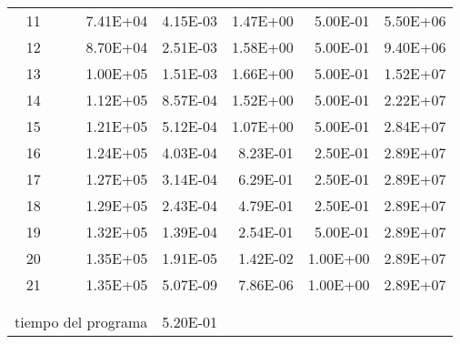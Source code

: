 \begin{table}[htbp]
\begin{tabular}{rrrrrr}
    11    & 7.41E+04 & 4.15E-03 & 1.47E+00 & 5.00E-01 & 5.50E+06 \\
    12    & 8.70E+04 & 2.51E-03 & 1.58E+00 & 5.00E-01 & 9.40E+06 \\
    13    & 1.00E+05 & 1.51E-03 & 1.66E+00 & 5.00E-01 & 1.52E+07 \\
    14    & 1.12E+05 & 8.57E-04 & 1.52E+00 & 5.00E-01 & 2.22E+07 \\
    15    & 1.21E+05 & 5.12E-04 & 1.07E+00 & 5.00E-01 & 2.84E+07 \\
    16    & 1.24E+05 & 4.03E-04 & 8.23E-01 & 2.50E-01 & 2.89E+07 \\
    17    & 1.27E+05 & 3.14E-04 & 6.29E-01 & 2.50E-01 & 2.89E+07 \\
    18    & 1.29E+05 & 2.43E-04 & 4.79E-01 & 2.50E-01 & 2.89E+07 \\
    19    & 1.32E+05 & 1.39E-04 & 2.54E-01 & 5.00E-01 & 2.89E+07 \\
    20    & 1.35E+05 & 1.91E-05 & 1.42E-02 & 1.00E+00 & 2.89E+07 \\
    21    & 1.35E+05 & 5.07E-09 & 7.86E-06 & 1.00E+00 & 2.89E+07 \\
          &       &       &       &       &  \\
          &       &       &       &       &  \\
    \multicolumn{2}{l}{tiempo del programa} & 5.20E-01 &       &       &  \\
    \bottomrule
    \end{tabular}%
  \label{tab:addlabel}%
\end{table}%
